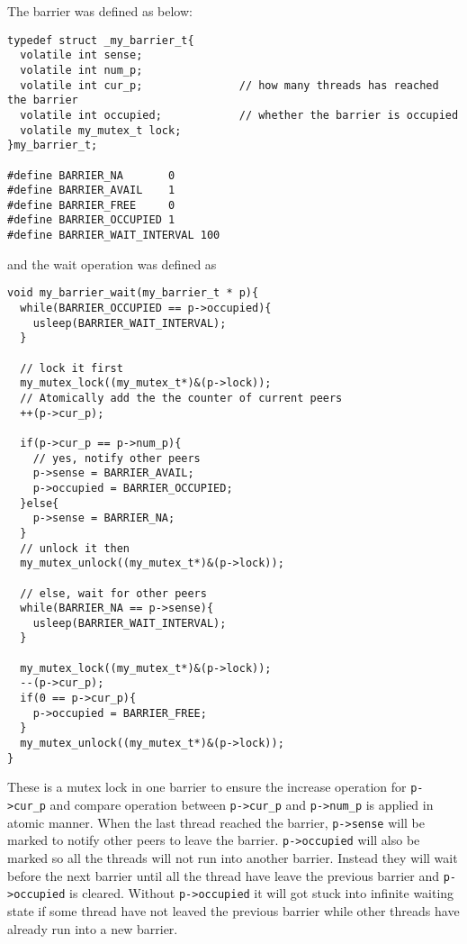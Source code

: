 \documentclass[12pt]{article}
\begin{document}
The barrier was defined as below:
\begin{verbatim}
typedef struct _my_barrier_t{
  volatile int sense;
  volatile int num_p;
  volatile int cur_p;				// how many threads has reached the barrier
  volatile int occupied;			// whether the barrier is occupied
  volatile my_mutex_t lock;
}my_barrier_t;

#define BARRIER_NA       0
#define BARRIER_AVAIL    1
#define BARRIER_FREE     0
#define BARRIER_OCCUPIED 1
#define BARRIER_WAIT_INTERVAL 100
\end{verbatim}
and the wait operation was defined as
\begin{verbatim}
void my_barrier_wait(my_barrier_t * p){
  while(BARRIER_OCCUPIED == p->occupied){
    usleep(BARRIER_WAIT_INTERVAL);
  }

  // lock it first
  my_mutex_lock((my_mutex_t*)&(p->lock));
  // Atomically add the the counter of current peers
  ++(p->cur_p);
  
  if(p->cur_p == p->num_p){
    // yes, notify other peers
    p->sense = BARRIER_AVAIL;
    p->occupied = BARRIER_OCCUPIED;
  }else{
    p->sense = BARRIER_NA;
  }
  // unlock it then
  my_mutex_unlock((my_mutex_t*)&(p->lock));

  // else, wait for other peers
  while(BARRIER_NA == p->sense){
    usleep(BARRIER_WAIT_INTERVAL);
  }
 
  my_mutex_lock((my_mutex_t*)&(p->lock));
  --(p->cur_p);
  if(0 == p->cur_p){
    p->occupied = BARRIER_FREE;
  }
  my_mutex_unlock((my_mutex_t*)&(p->lock));
}
\end{verbatim}
These is a mutex lock in one barrier to ensure the increase operation for 
\texttt{p->cur\_p} and compare operation between \texttt{p->cur\_p} and 
\texttt{p->num\_p} is applied in atomic manner. When the last thread reached
the barrier, \texttt{p->sense} will be marked to notify other peers to leave
the barrier. \texttt{p->occupied} will also be marked so all the threads will 
not run into another barrier. Instead they will wait before the next barrier 
until all the thread have leave the previous barrier and \texttt{p->occupied} 
is cleared. Without \texttt{p->occupied} it will got stuck into infinite waiting
state if some thread have not leaved the previous barrier while other threads
have already run into a new barrier.
\end{document}
